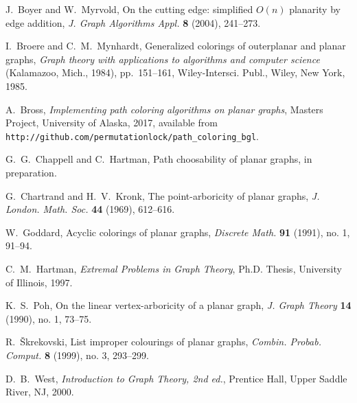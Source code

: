 \documentclass[12pt,letterpaper]{article}
\theoremstyle{plain}
\theoremstyle{definition}
\theoremstyle{break}
\begin{document}
\begin{thebibliography}{99}

J.~Boyer and W.~Myrvold, On the cutting edge: simplified $O(n)$ planarity by edge
addition,
\textit{J. Graph Algorithms Appl.}
\textbf{8} (2004),
241--273.

I.~Broere and C.~M.~Mynhardt,
Generalized colorings of outerplanar and planar graphs,
\textit{Graph theory with applications to algorithms and computer science}
 (Kalamazoo, Mich., 1984),
pp.~151--161,
Wiley-Intersci. Publ., Wiley, New York, 1985.

A.~Bross,
\textit{Implementing path coloring algorithms on planar graphs},
Masters Project,
University of Alaska,
2017,
available from\hfil\break
\texttt{http://github.com/permutationlock/path\_coloring\_bgl}.

G.~G.~Chappell and C.~Hartman,
Path choosability of planar graphs,
in preparation.

G.~Chartrand and H.~V.~Kronk,
The point-arboricity of planar graphs,
\textit{J. London. Math. Soc.}
\textbf{44} (1969),
612--616.

W.~Goddard,
Acyclic colorings of planar graphs,
\textit{Discrete Math.}
\textbf{91} (1991), no. 1,
91--94.

C.~M.~Hartman,
\textit{Extremal Problems in Graph Theory},
Ph.D. Thesis,
University of Illinois,
1997.

K.~S.~Poh,
On the linear vertex-arboricity of a planar graph,
\textit{J. Graph Theory}
\textbf{14} (1990), no. 1,
73--75.

R.~\v{S}krekovski,
List improper colourings of planar graphs,
\textit{Combin. Probab. Comput.}
\textbf{8} (1999), no. 3,
293--299.

D.~B.~West,
\textit{Introduction to Graph Theory, 2nd ed.},
Prentice Hall,
Upper Saddle River, NJ,
2000.

\end{thebibliography}
\end{document}
